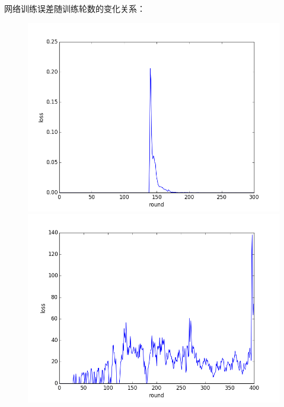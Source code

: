 \documentclass[a4paper,UTF8]{article}
\theoremstyle{definition}
\begin{document}
网络训练误差随训练轮数的变化关系：
\begin{figure}
	\centering                                                          %
	\begin{minipage}{7cm}
		\centering                                                          %
		\includegraphics[scale=0.5]{exper4_cartpole_loss1.png}               %
	\end{minipage}
	\begin{minipage}{7cm}
		\centering                                                          %
		\includegraphics[scale=0.4]{exper4_mountaincar_loss.png}                %
	\end{minipage}


\end{figure}
\end{document}
